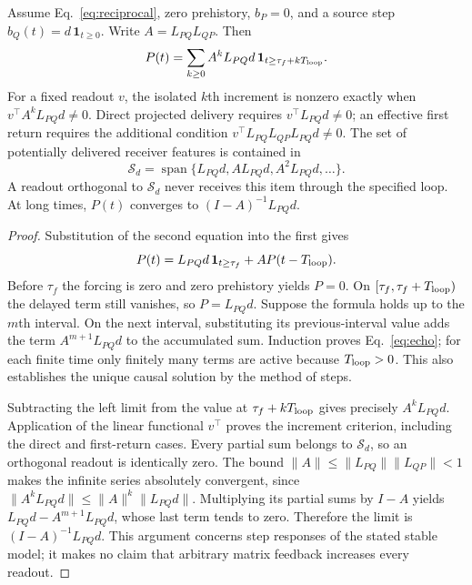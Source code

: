 \begin{theorem}\label{thm:reciprocal}
Assume Eq.~\eqref{eq:reciprocal}, zero prehistory, $b_P=0$, and a source step $b_Q(t)=d\,\mathbf{1}_{t\ge0}$. Write $A=L_{PQ}L_{QP}$. Then
\begin{equation}
P(t)=\sum_{k\ge0} A^k L_{PQ}d\,
\mathbf{1}_{t\ge\tau_f+kT_{\rm loop}}.\label{eq:echo}
\end{equation}
For a fixed readout $v$, the isolated $k$th increment is nonzero exactly when $v^\top A^kL_{PQ}d\ne0$. Direct projected delivery requires $v^\top L_{PQ}d\ne0$; an effective first return requires the additional condition $v^\top L_{PQ}L_{QP}L_{PQ}d\ne0$. The set of potentially delivered receiver features is contained in
\[
\mathcal S_d=\operatorname{span}\{L_{PQ}d,AL_{PQ}d,A^2L_{PQ}d,\ldots\}.
\]
A readout orthogonal to $\mathcal S_d$ never receives this item through the specified loop. At long times, $P(t)$ converges to $(I-A)^{-1}L_{PQ}d$.
\end{theorem}
\begin{proof}
Substitution of the second equation into the first gives
\[
P(t)=L_{PQ}d\,\mathbf{1}_{t\ge\tau_f}+A P(t-T_{\rm loop}).
\]
Before $\tau_f$ the forcing is zero and zero prehistory yields $P=0$. On $[\tau_f,\tau_f+T_{\rm loop})$ the delayed term still vanishes, so $P=L_{PQ}d$. Suppose the formula holds up to the $m$th interval. On the next interval, substituting its previous-interval value adds the term $A^{m+1}L_{PQ}d$ to the accumulated sum. Induction proves Eq.~\eqref{eq:echo}; for each finite time only finitely many terms are active because $T_{\rm loop}>0$. This also establishes the unique causal solution by the method of steps.

Subtracting the left limit from the value at $\tau_f+kT_{\rm loop}$ gives precisely $A^kL_{PQ}d$. Application of the linear functional $v^\top$ proves the increment criterion, including the direct and first-return cases. Every partial sum belongs to $\mathcal S_d$, so an orthogonal readout is identically zero. The bound $\|A\|\le\|L_{PQ}\|\|L_{QP}\|<1$ makes the infinite series absolutely convergent, since $\|A^kL_{PQ}d\|\le\|A\|^k\|L_{PQ}d\|$. Multiplying its partial sums by $I-A$ yields $L_{PQ}d-A^{m+1}L_{PQ}d$, whose last term tends to zero. Therefore the limit is $(I-A)^{-1}L_{PQ}d$. This argument concerns step responses of the stated stable model; it makes no claim that arbitrary matrix feedback increases every readout.
\end{proof}

